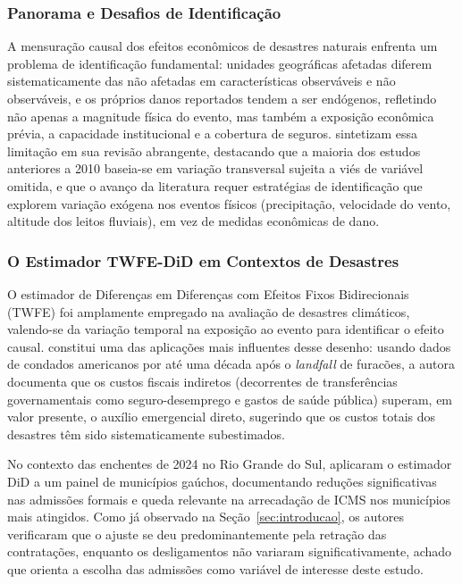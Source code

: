 \documentclass[a4paper,12pt]{article}
\begin{document}
\subsubsection{Panorama e Desafios de Identificação}

A mensuração causal dos efeitos econômicos de desastres naturais enfrenta um problema
de identificação fundamental: unidades geográficas afetadas diferem sistematicamente das
não afetadas em características observáveis e não observáveis, e os próprios danos
reportados tendem a ser endógenos, refletindo não apenas a magnitude física do evento,
mas também a exposição econômica prévia, a capacidade institucional e a cobertura de
seguros.  sintetizam essa limitação em sua revisão abrangente,
destacando que a maioria dos estudos anteriores a 2010 baseia-se em variação transversal
sujeita a viés de variável omitida, e que o avanço da literatura requer estratégias de
identificação que explorem variação exógena nos eventos físicos (precipitação,
velocidade do vento, altitude dos leitos fluviais), em vez de medidas econômicas de dano.

\subsubsection{O Estimador TWFE-DiD em Contextos de Desastres}

O estimador de Diferenças em Diferenças com Efeitos Fixos Bidirecionais (TWFE) foi
amplamente empregado na avaliação de desastres climáticos, valendo-se da variação
temporal na exposição ao evento para identificar o efeito causal. 
constitui uma das aplicações mais influentes desse desenho: usando dados de condados
americanos por até uma década após o \textit{landfall} de furacões, a autora documenta
que os custos fiscais indiretos (decorrentes de transferências governamentais como
seguro-desemprego e gastos de saúde pública) superam, em valor presente, o auxílio
emergencial direto, sugerindo que os custos totais dos desastres têm sido sistematicamente
subestimados.

No contexto das enchentes de 2024 no Rio Grande do Sul, 
aplicaram o estimador DiD a um painel de municípios gaúchos, documentando reduções
significativas nas admissões formais e queda relevante na arrecadação de ICMS nos
municípios mais atingidos. Como já observado na Seção~\ref{sec:introducao}, os autores
verificaram que o ajuste se deu predominantemente pela retração das contratações,
enquanto os desligamentos não variaram significativamente, achado que orienta a
escolha das admissões como variável de interesse deste estudo.
\end{document}
